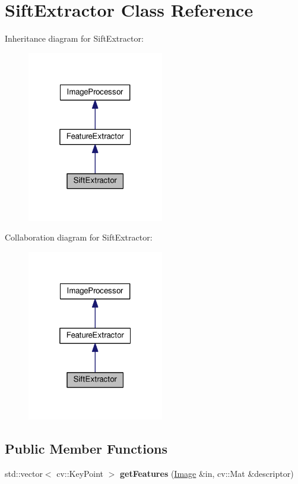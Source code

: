 \hypertarget{classSiftExtractor}{}\section{Sift\+Extractor Class Reference}
\label{classSiftExtractor}


Inheritance diagram for Sift\+Extractor\+:\nopagebreak
\begin{figure}[H]
\begin{center}
\leavevmode
\includegraphics[width=169pt]{classSiftExtractor__inherit__graph}
\end{center}
\end{figure}


Collaboration diagram for Sift\+Extractor\+:\nopagebreak
\begin{figure}[H]
\begin{center}
\leavevmode
\includegraphics[width=169pt]{classSiftExtractor__coll__graph}
\end{center}
\end{figure}
\subsection*{Public Member Functions}
\begin{DoxyCompactItemize}
\item 
std\+::vector$<$ cv\+::\+Key\+Point $>$ {\bfseries get\+Features} (\hyperlink{classImage}{Image} \&in, cv\+::\+Mat \&descriptor)\hypertarget{classSiftExtractor_a1dcf2cf98db3c67fb95433a540ed5198}{}\label{classSiftExtractor_a1dcf2cf98db3c67fb95433a540ed5198}

\end{DoxyCompactItemize}
